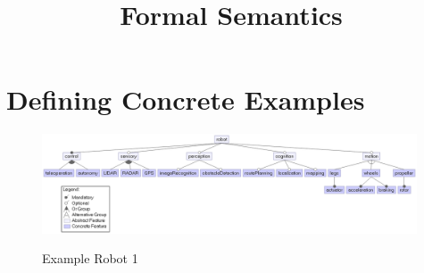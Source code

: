 \documentclass{article}
\title{Formal Semantics}
\author{}
\date{}
\begin{document}
\maketitle

\section{Defining Concrete Examples}

\begin{figure}[H]
	\caption{Example Robot 1}
	\centering
	\includegraphics[width=0.99\textwidth]{images/exp.png}
	\label{conmet}
\end{figure}
\end{document}
